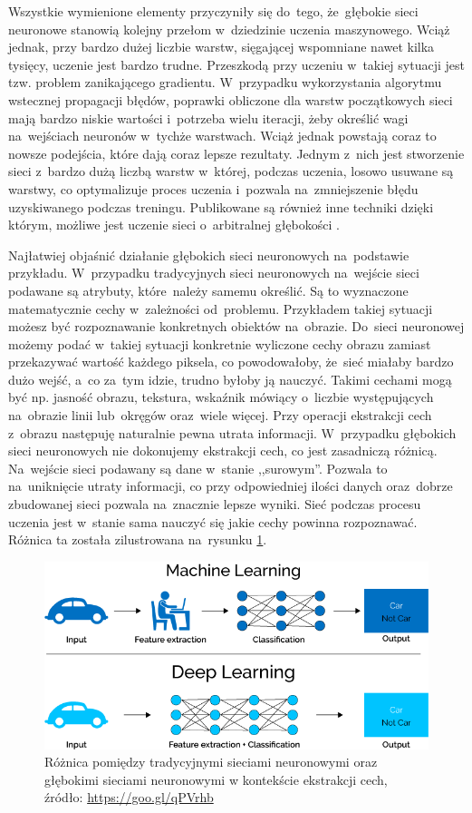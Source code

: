 Wszystkie wymienione elementy przyczyniły się do~tego, że~głębokie sieci neuronowe stanowią kolejny przełom w~dziedzinie uczenia maszynowego. Wciąż jednak, przy bardzo dużej liczbie warstw, sięgającej wspomniane nawet kilka tysięcy, uczenie jest bardzo trudne. Przeszkodą przy uczeniu w~takiej sytuacji jest tzw. problem zanikającego gradientu. W~przypadku wykorzystania algorytmu wstecznej propagacji błędów, poprawki obliczone dla warstw początkowych sieci mają bardzo niskie wartości i~potrzeba wielu iteracji, żeby określić wagi na~wejściach neuronów w~tychże warstwach. Wciąż jednak powstają coraz to nowsze podejścia, które dają coraz lepsze rezultaty. Jednym z~nich jest stworzenie sieci z~bardzo dużą liczbą warstw w~której, podczas uczenia, losowo usuwane są warstwy, co optymalizuje proces uczenia\cite{veryDeep} i~pozwala na~zmniejszenie błędu uzyskiwanego podczas treningu. Publikowane są również inne techniki dzięki którym, możliwe jest uczenie sieci o~arbitralnej głębokości \cite{veryDeep2}.

Najłatwiej objaśnić działanie głębokich sieci neuronowych na~podstawie przykładu. W~przypadku tradycyjnych sieci neuronowych na~wejście sieci podawane są atrybuty, które~należy samemu określić. Są to wyznaczone matematycznie cechy w~zależności od~problemu. Przykładem takiej sytuacji możesz być rozpoznawanie konkretnych obiektów na~obrazie. Do~sieci neuronowej możemy podać w~takiej sytuacji konkretnie wyliczone cechy obrazu zamiast przekazywać wartość każdego piksela, co powodowałoby, że~sieć miałaby bardzo dużo wejść, a~co za~tym idzie, trudno byłoby ją nauczyć. Takimi cechami mogą być np. jasność obrazu, tekstura, wskaźnik mówiący o~liczbie występujących na~obrazie linii lub~okręgów oraz~wiele więcej. Przy operacji ekstrakcji cech z~obrazu następuję naturalnie pewna utrata informacji. W~przypadku głębokich sieci neuronowych nie dokonujemy ekstrakcji cech, co jest zasadniczą różnicą. Na~wejście sieci podawany są dane w~stanie ,,surowym''. Pozwala to na~uniknięcie utraty informacji, co przy odpowiedniej ilości danych oraz~dobrze zbudowanej sieci pozwala na~znacznie lepsze wyniki. Sieć podczas procesu uczenia jest w~stanie sama nauczyć się jakie cechy powinna rozpoznawać. Różnica ta została zilustrowana na~rysunku \ref{dnnDiff}.

\begin{figure}[ht!]
\centering
\includegraphics[scale=0.5]{res/dnn1.png}
\caption[Caption for LOF]{Różnica pomiędzy tradycyjnymi sieciami neuronowymi oraz głębokimi sieciami neuronowymi w kontekście ekstrakcji cech, źródło: \url{https://goo.gl/qPVrhb}\label{dnnDiff}} 
\end{figure}

